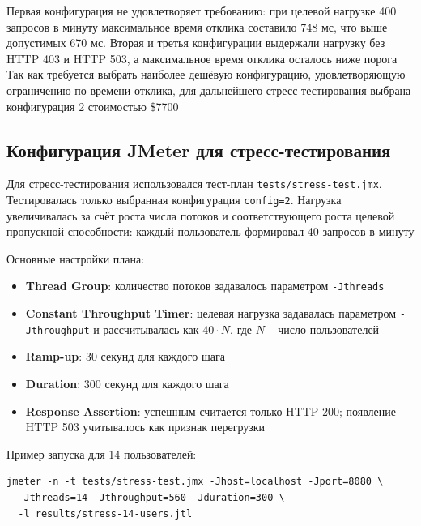 \documentclass[12pt,a4paper]{report}
\begin{document}
Первая конфигурация не удовлетворяет требованию: при целевой нагрузке 400 запросов в минуту максимальное время отклика составило 748 мс, что выше допустимых 670 мс. Вторая и третья конфигурации выдержали нагрузку без HTTP 403 и HTTP 503, а максимальное время отклика осталось ниже порога \\
\hfill\break
Так как требуется выбрать наиболее дешёвую конфигурацию, удовлетворяющую ограничению по времени отклика, для дальнейшего стресс-тестирования выбрана конфигурация 2 стоимостью \$7700

\subsection*{Конфигурация JMeter для стресс-тестирования}
Для стресс-тестирования использовался тест-план \texttt{tests/stress-test.jmx}. Тестировалась только выбранная конфигурация \texttt{config=2}. Нагрузка увеличивалась за счёт роста числа потоков и соответствующего роста целевой пропускной способности: каждый пользователь формировал 40 запросов в минуту

Основные настройки плана:
\begin{itemize}
    \item \textbf{Thread Group}: количество потоков задавалось параметром \texttt{-Jthreads}
    \item \textbf{Constant Throughput Timer}: целевая нагрузка задавалась параметром \texttt{-Jthroughput} и рассчитывалась как $40 \cdot N$, где $N$ -- число пользователей
    \item \textbf{Ramp-up}: 30 секунд для каждого шага
    \item \textbf{Duration}: 300 секунд для каждого шага
    \item \textbf{Response Assertion}: успешным считается только HTTP 200; появление HTTP 503 учитывалось как признак перегрузки
\end{itemize}

Пример запуска для 14 пользователей:
\begin{verbatim}
jmeter -n -t tests/stress-test.jmx -Jhost=localhost -Jport=8080 \
  -Jthreads=14 -Jthroughput=560 -Jduration=300 \
  -l results/stress-14-users.jtl
\end{verbatim}
\end{document}
